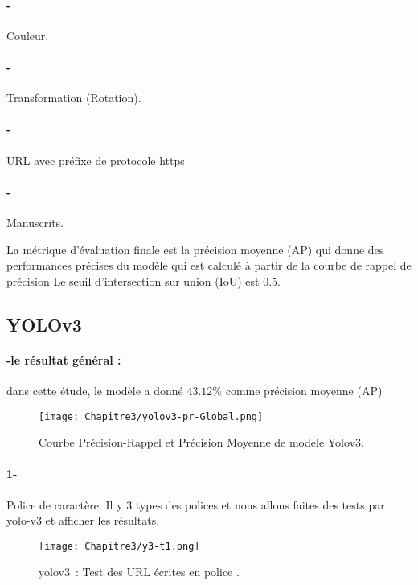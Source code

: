      \paragraph{-} Couleur.
     \paragraph{-} Transformation (Rotation).
     \paragraph{-} URL avec préfixe de protocole https
     \paragraph{-} Manuscrits.
     
     La métrique d'évaluation finale est la précision moyenne (AP) qui donne des performances précises du modèle qui est calculé à partir de la courbe de rappel de précision
     Le seuil d'intersection sur union (IoU) est $0.5$.

     \subsection{YOLOv3}
      \paragraph{-le résultat général :} 
          dans cette étude, le modèle a donné $43.12\%$ comme précision moyenne (AP) 
      \begin{figure}[H]
               \centering
                \texttt{[image: Chapitre3/yolov3-pr-Global.png]}
                \caption{Courbe Précision-Rappel et Précision Moyenne de modele Yolov3.}
                \label{y3_t0}
                \end{figure}

      \paragraph{1-} Police de caractère.
         Il y  3 types des polices  et nous allons faites des tests par yolo-v3 et afficher les résultats.
      \begin{figure}[H]
              \centering
               \texttt{[image: Chapitre3/y3-t1.png]}
               \caption{yolov3 : Test des URL écrites en police .}
               \label{y3_t1}
               \end{figure}
       
